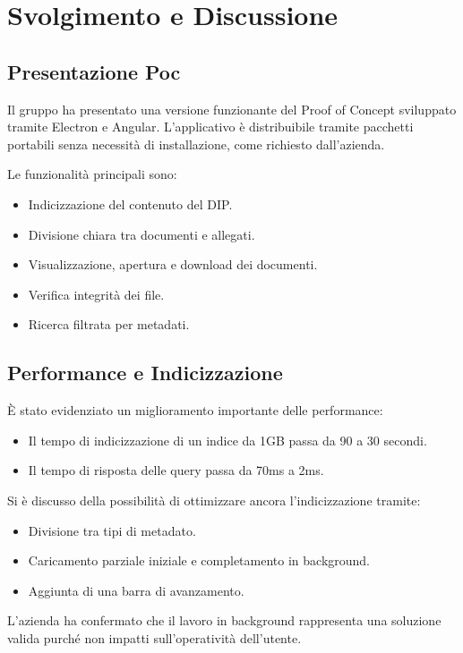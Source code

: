 \documentclass[a4paper,12pt]{article}
\begin{document}
\section{Svolgimento e Discussione}

\subsection{Presentazione Poc}

Il gruppo ha presentato una versione funzionante del Proof of Concept sviluppato tramite Electron e Angular.  
L’applicativo è distribuibile tramite pacchetti portabili senza necessità di installazione, come richiesto dall'azienda.

Le funzionalità principali sono:
\begin{itemize}
    \item Indicizzazione del contenuto del DIP.
    \item Divisione chiara tra documenti e allegati.
    \item Visualizzazione, apertura e download dei documenti.
    \item Verifica integrità dei file.
    \item Ricerca filtrata per metadati.
\end{itemize}

\subsection{Performance e Indicizzazione}

È stato evidenziato un miglioramento importante delle performance:
\begin{itemize}
    \item Il tempo di indicizzazione di un indice da 1GB passa da 90 a 30 secondi.
    \item Il tempo di risposta delle query passa da 70ms a 2ms.
\end{itemize}

Si è discusso della possibilità di ottimizzare ancora l’indicizzazione tramite:
\begin{itemize}
    \item Divisione tra tipi di metadato.
    \item Caricamento parziale iniziale e completamento in background.
    \item Aggiunta di una barra di avanzamento.
\end{itemize}

L’azienda ha confermato che il lavoro in background rappresenta una soluzione valida purché non impatti sull’operatività dell’utente.
\end{document}
